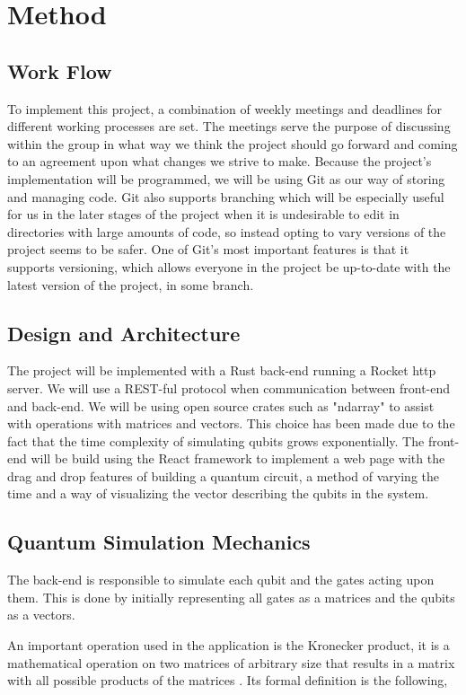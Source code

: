\section{Method}

\subsection{Work Flow} %
To implement this project, a combination of weekly meetings and deadlines for different working processes are set. The meetings serve the purpose of discussing within the group in what way we think the project should go forward and coming to an agreement upon what changes we strive to make. Because the project's implementation will be programmed, we will be using Git as our way of storing and managing code. Git also supports branching which will be especially useful for us in the later stages of the project when it is undesirable to edit in directories with large amounts of code, so instead opting to vary versions of the project seems to be safer. One of Git's most important features is that it supports versioning, which allows everyone in the project be up-to-date with the latest version of the project, in some branch.

\subsection{Design and Architecture} %
The project will be implemented with a Rust back-end running a Rocket http server. We will use a REST-ful protocol when communication between front-end and back-end. We will be using open source crates such as "ndarray" to assist with operations with matrices and vectors. This choice has been made due to the fact that the time complexity of simulating qubits grows exponentially. The front-end will be build using the React framework to implement a web page with the drag and drop features of building a quantum circuit, a method of varying the time and a way of visualizing the vector describing the qubits in the system.


\subsection{Quantum Simulation Mechanics}
The back-end is responsible to simulate each qubit and the gates acting upon them. This is done by initially representing all gates as a matrices and the qubits as a vectors. 

An important operation used in the application is the Kronecker product, it is a mathematical operation on two matrices of arbitrary size that results in a matrix with all possible products of the matrices \cite{kronecker}. Its formal definition is the following,

